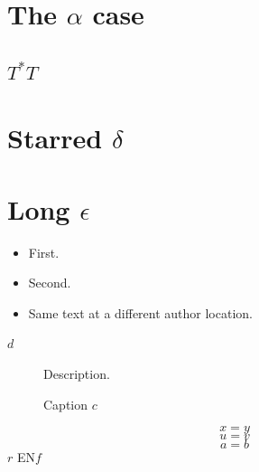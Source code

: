 \documentclass{article}
\newcommand{\tagprefix}{Prefix }
\def\untilpair#1END{#1}
\begin{document}
\section{The $\alpha$ case}
\subsection{$T^{*}T$}
\section*{Starred $\delta$}
\section[Short $s$]{Long $\epsilon$}
\begin{itemize}
\item[$\beta$] First.
\item[$\beta+1$] Second.
\item[$\beta$] Same text at a different author location.
\end{itemize}
\begin{description}
\item[$d$] Description.
\end{description}
\begin{figure}
\subfloat[{Grouped $h$}]{\rule{1em}{1em}}
\caption[Short $k$]{Caption $c$\label{fig:inside}}\label{fig:outside}
\end{figure}
\begin{equation}x=y\tag{$\dagger$}\end{equation}
\begin{equation}u=v\tag*{$\ddagger$}\end{equation}
\begin{equation}a=b\tag{\tagprefix $q$}\end{equation}
\untilpair {$r$}END
\untilpair EN$f$END
\end{document}
